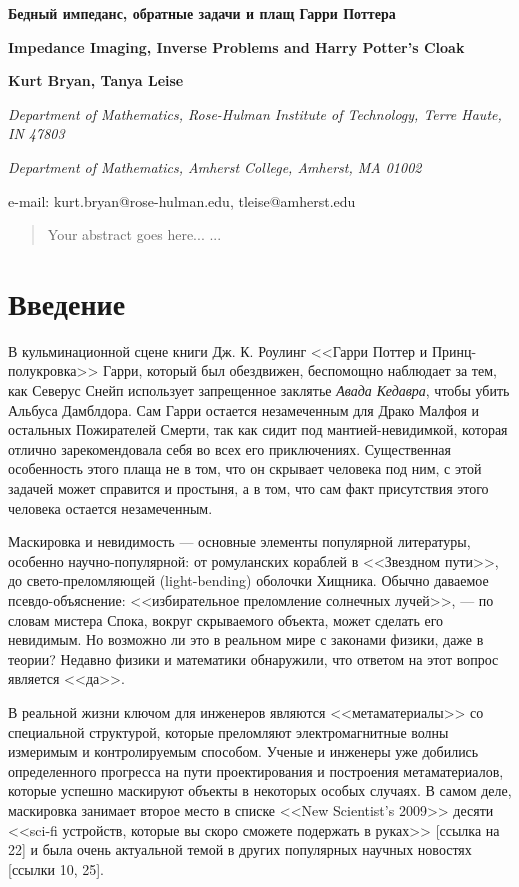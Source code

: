 \documentclass[a4paper, 12pt]{article}
\newcommand{\tit}[1]{\begin{center}{\bf{\Large #1}}\end{center}}
\newcommand{\aut}[1]{\centerline{{\bf #1}}}
\newcommand{\cityorg}[1]{\centerline{\it #1}}
\newcommand{\email}[1]{\centerline{{\small e-mail: #1}}\vspace{\baselineskip}}
\begin{document}
\sloppy

 \tit{Бедный импеданс, обратные задачи и плащ Гарри Поттера}
 \tit{Impedance Imaging,
Inverse Problems
and Harry Potter’s Cloak}
 \aut{Kurt Bryan, Tanya Leise}
 \cityorg{Department of Mathematics, Rose-Hulman Institute of Technology, Terre Haute, IN 47803}
  \cityorg{Department of Mathematics, Amherst College, Amherst, MA 01002}
 \email{kurt.bryan@rose-hulman.edu, tleise@amherst.edu}

\begin{abstract}
Your abstract goes here...
...
\end{abstract}

\setcounter{secnumdepth}{5}

\section{Введение}


В кульминационной сцене книги Дж. К. Роулинг <<Гарри Поттер и Принц-полукровка>> Гарри, который был обездвижен, беспомощно наблюдает за тем, как Северус Снейп использует запрещенное заклятье \textit{Авада Кедавра}, чтобы убить Альбуса Дамблдора. Сам Гарри остается незамеченным для Драко Малфоя и остальных Пожирателей Смерти, так как сидит под мантией-невидимкой, которая отлично зарекомендовала себя во всех его приключениях. Существенная особенность этого плаща не в том, что он скрывает человека под ним, с этой задачей может справится и простыня, а в том, что сам факт присутствия этого человека остается незамеченным.


Маскировка и невидимость --- основные элементы популярной литературы, особенно научно-популярной: от ромуланских кораблей в <<Звездном пути>>, до свето-преломляющей (light-bending) оболочки Хищника. Обычно даваемое псевдо-объяснение: <<избирательное преломление солнечных лучей>>, --- по словам мистера Спока, вокруг скрываемого объекта, может сделать его невидимым. Но возможно ли это в реальном мире с законами физики, даже в теории? Недавно физики и математики обнаружили, что ответом на этот вопрос является <<да>>.


В реальной жизни ключом для инженеров являются <<метаматериалы>> со специальной структурой, которые преломляют электромагнитные волны измеримым и контролируемым способом. Ученые и инженеры уже добились определенного прогресса на пути проектирования и построения метаматериалов, которые успешно маскируют объекты в некоторых особых случаях. В самом деле, маскировка занимает второе место в списке <<New Scientist's 2009>> десяти <<sci-fi устройств, которые вы скоро сможете подержать в руках>> [ссылка на 22] и была очень актуальной темой в других популярных научных новостях [ссылки 10, 25].
\end{document}
